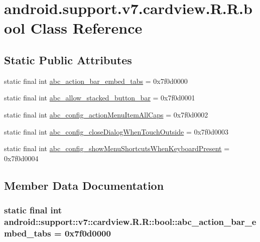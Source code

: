 \hypertarget{classandroid_1_1support_1_1v7_1_1cardview_1_1_r_1_1bool}{
\section{android.support.v7.cardview.R.R.bool Class Reference}
\label{classandroid_1_1support_1_1v7_1_1cardview_1_1_r_1_1bool}
}
\subsection*{Static Public Attributes}
\begin{CompactItemize}
\item 
static final int \hyperlink{classandroid_1_1support_1_1v7_1_1cardview_1_1_r_1_1bool_50e7da48503dc2d4e05b05aeaddbdfaf}{abc\_\-action\_\-bar\_\-embed\_\-tabs} = 0x7f0d0000
\item 
static final int \hyperlink{classandroid_1_1support_1_1v7_1_1cardview_1_1_r_1_1bool_7fb6189ae51c8ef1a42c90b26ad1c6d8}{abc\_\-allow\_\-stacked\_\-button\_\-bar} = 0x7f0d0001
\item 
static final int \hyperlink{classandroid_1_1support_1_1v7_1_1cardview_1_1_r_1_1bool_03c9292dd8655ec317eb60c3ddc0e10d}{abc\_\-config\_\-actionMenuItemAllCaps} = 0x7f0d0002
\item 
static final int \hyperlink{classandroid_1_1support_1_1v7_1_1cardview_1_1_r_1_1bool_35e321c0fc86aa8a03984f6044f73b2d}{abc\_\-config\_\-closeDialogWhenTouchOutside} = 0x7f0d0003
\item 
static final int \hyperlink{classandroid_1_1support_1_1v7_1_1cardview_1_1_r_1_1bool_e92ccf38955ece79dc5ef13cea1584d2}{abc\_\-config\_\-showMenuShortcutsWhenKeyboardPresent} = 0x7f0d0004
\end{CompactItemize}


\subsection{Member Data Documentation}
\hypertarget{classandroid_1_1support_1_1v7_1_1cardview_1_1_r_1_1bool_50e7da48503dc2d4e05b05aeaddbdfaf}{
\subsubsection[{abc\_\-action\_\-bar\_\-embed\_\-tabs}]{\setlength{\rightskip}{0pt plus 5cm}static final int android::support::v7::cardview.R.R::bool::abc\_\-action\_\-bar\_\-embed\_\-tabs = 0x7f0d0000}}
\label{classandroid_1_1support_1_1v7_1_1cardview_1_1_r_1_1bool_50e7da48503dc2d4e05b05aeaddbdfaf}



